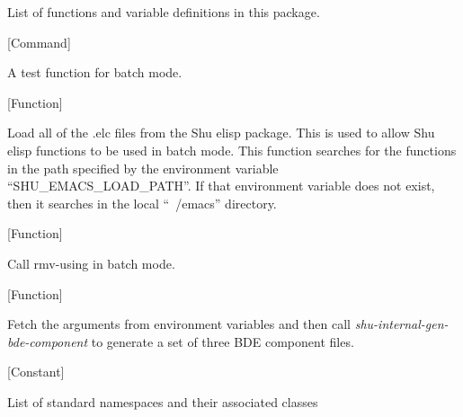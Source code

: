 List of functions and variable definitions in this package.



\vspace{1em}
\noindent
{}
\usebox{\funcname}
 \hfill [Command]

\begin{doc-string}
A test function for batch mode.
\end{doc-string}

\vspace{1em}
\noindent
{}
\usebox{\funcname}
 \hfill [Function]

\begin{doc-string}
Load all of the .elc files from the Shu elisp package.  This is used to allow
Shu elisp functions to be used in batch mode.  This function searches for the
functions in the path specified by the environment variable
``SHU\_EMACS\_LOAD\_PATH''.  If that environment variable does not exist, then it
searches in the local ``~/emacs'' directory.
\end{doc-string}

\vspace{1em}
\noindent
{}
\usebox{\funcname}
 \hfill [Function]

\begin{doc-string}
Call rmv-using in batch mode.
\end{doc-string}

\vspace{1em}
\noindent
{}
\usebox{\funcname}
 \hfill [Function]

\begin{doc-string}
Fetch the arguments from environment variables and then call
\emph{shu-internal-gen-bde-component} to generate a set of three BDE component
files.
\end{doc-string}

\vspace{1em}
\noindent
{}
\usebox{\funcname}
 \hfill [Constant]

\begin{doc-string}
List of standard namespaces and their associated classes
\end{doc-string}

